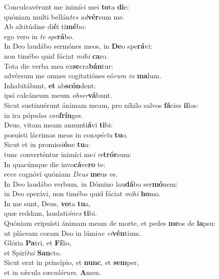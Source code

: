 \evenverse Conculcavérunt me inimíci mei \textbf{to}ta \textbf{di}e:~\*\\
\evenverse quóniam multi bellán\textit{tes} \textit{ad}\textbf{vér}sum me.\\
\oddverse Ab altitúdine di\textbf{é}i ti\textbf{mé}bo:~\*\\
\oddverse ego vero in \textit{te} \textit{spe}\textbf{rá}bo.\\
\evenverse In Deo laudábo sermónes meos, in \textbf{De}o spe\textbf{rá}vi:~\*\\
\evenverse non timébo quid fáciat \textit{mi}\textit{hi} \textbf{ca}ro.\\
\oddverse Tota die verba mea ex\textbf{se}cra\textbf{bán}tur:~\*\\
\oddverse advérsum me omnes cogitatiónes eó\textit{rum} \textit{in} \textbf{ma}lum.\\
\evenverse Inhabitábunt, \textbf{et} ab\textbf{scón}dent:~\*\\
\evenverse ipsi calcáneum meum \textit{ob}\textit{ser}\textbf{vá}bunt.\\
\oddverse Sicut sustinuérunt ánimam meam, pro níhilo salvos \textbf{fá}cies \textbf{il}los:~\*\\
\oddverse in ira pópu\textit{los} \textit{con}\textbf{frín}ges.\\
\evenverse Deus, vitam meam annunti\textbf{á}vi \textbf{ti}bi:~\*\\
\evenverse posuísti lácrimas meas in con\textit{spé}\textit{ctu} \textbf{tu}o.\\
\oddverse Sicut et in promissi\textbf{ó}ne \textbf{tu}a:~\*\\
\oddverse tunc converténtur inimíci me\textit{i} \textit{re}\textbf{trór}sum:\\
\evenverse In quacúmque die invo\textbf{cá}ve\textbf{ro} te:~\*\\
\evenverse ecce cognóvi quóniam \textit{De}\textit{us} \textbf{me}us es.\\
\oddverse In Deo laudábo verbum, in Dómino lau\textbf{dá}bo ser\textbf{mó}nem:~\*\\
\oddverse in Deo sperávi, non timébo quid fáciat \textit{mi}\textit{hi} \textbf{ho}mo.\\
\evenverse In me sunt, Deus, \textbf{vo}ta \textbf{tu}a,~\*\\
\evenverse quæ reddam, laudati\textit{ó}\textit{nes} \textbf{ti}bi.\\
\oddverse Quóniam eripuísti ánimam meam de morte, et pedes \textbf{me}os de \textbf{la}psu:~\*\\
\oddverse ut pláceam coram Deo in lúmi\textit{ne} \textit{vi}\textbf{vén}tium.\\
\evenverse Glória \textbf{Pa}tri, et \textbf{Fí}lio,~\*\\
\evenverse et Spirí\textit{tu}\textit{i} \textbf{San}cto.\\
\oddverse Sicut erat in princípio, et \textbf{nunc}, et \textbf{sem}per,~\*\\
\oddverse et in sǽcula sæcu\textit{ló}\textit{rum}. \textbf{A}men.\\
